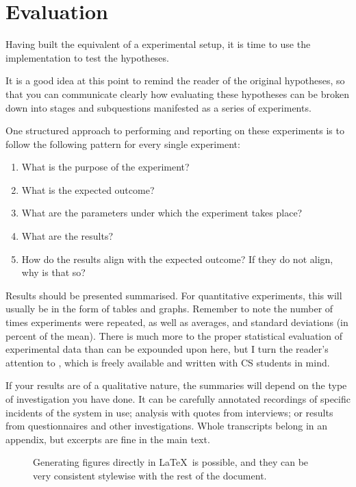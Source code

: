 \chapter{Evaluation}
\label{cha:evaluation}

Having built the equivalent of a experimental setup, it is time to use the
implementation to test the hypotheses.

It is a good idea at this point to remind the reader of the original
hypotheses, so that you can communicate clearly how evaluating these
hypotheses can be broken down into stages and subquestions manifested as a
series of experiments.

One structured approach to performing and reporting on these experiments is
to follow the following pattern for every single experiment:

\begin{enumerate}
\item What is the purpose of the experiment?
\item What is the expected outcome?
\item What are the parameters under which the experiment takes place?
\item What are the results?
\item How do the results align with the expected outcome? If they do not
  align, why is that so?
\end{enumerate}

Results should be presented summarised. For quantitative experiments, this
will usually be in the form of tables and graphs.  Remember to note the
number of times experiments were repeated, as well as averages, and standard
deviations (in percent of the mean).  There is much more to the proper
statistical evaluation of experimental data than can be expounded upon here,
but I turn the reader's attention to \citep{Downey2011:TSPASFP2011}, which
is freely available and written with CS students in mind.

If your results are of a qualitative nature, the summaries will depend on
the type of investigation you have done. It can be carefully annotated
recordings of specific incidents of the system in use; analysis with quotes
from interviews; or results from questionnaires and other investigations.
Whole transcripts belong in an appendix, but excerpts are fine in the main
text.



\begin{figure}
  \myfloatalign
  \caption[A graph with error bars]{Generating figures directly in \LaTeX\ is possible, and they can be very consistent stylewise with the rest of the document.}
  \label{fig:pretty-graph}
\end{figure}



